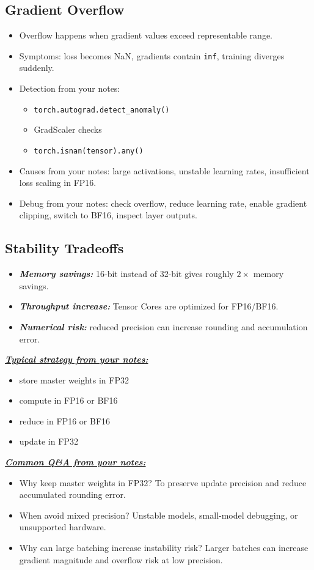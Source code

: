 \documentclass[12pt]{article}
\newcommand{\keysent}[1]{\textbf{\textit{\uline{#1}}}}
\let\origtextbf\textbf
\renewcommand{\textbf}[1]{\origtextbf{\textit{#1}}}
\begin{document}
\subsection{Gradient Overflow}
\begin{itemize}
\item Overflow happens when gradient values exceed representable range.
\item Symptoms: loss becomes NaN, gradients contain \texttt{inf}, training diverges suddenly.
\item Detection from your notes:
\begin{itemize}
\item \texttt{torch.autograd.detect\_anomaly()}
\item GradScaler checks
\item \texttt{torch.isnan(tensor).any()}
\end{itemize}
\item Causes from your notes: large activations, unstable learning rates, insufficient loss scaling in FP16.
\item Debug from your notes: check overflow, reduce learning rate, enable gradient clipping, switch to BF16, inspect layer outputs.
\end{itemize}

\subsection{Stability Tradeoffs}
\begin{itemize}
\item \textbf{Memory savings:} 16-bit instead of 32-bit gives roughly \(2\times\) memory savings.
\item \textbf{Throughput increase:} Tensor Cores are optimized for FP16/BF16.
\item \textbf{Numerical risk:} reduced precision can increase rounding and accumulation error.
\end{itemize}

\keysent{Typical strategy from your notes:}
\begin{itemize}
\item store master weights in FP32
\item compute in FP16 or BF16
\item reduce in FP16 or BF16
\item update in FP32
\end{itemize}

\keysent{Common Q\&A from your notes:}
\begin{itemize}
\item Why keep master weights in FP32? To preserve update precision and reduce accumulated rounding error.
\item When avoid mixed precision? Unstable models, small-model debugging, or unsupported hardware.
\item Why can large batching increase instability risk? Larger batches can increase gradient magnitude and overflow risk at low precision.
\end{itemize}
\end{document}
